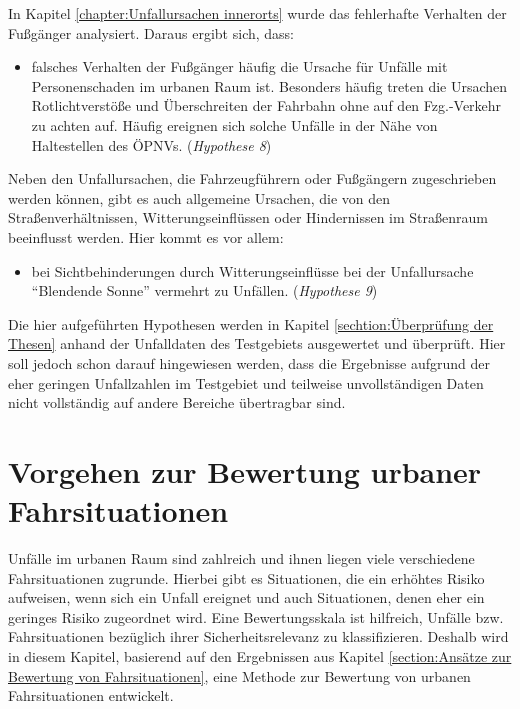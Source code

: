 In Kapitel \ref{chapter:Unfallursachen innerorts} wurde das fehlerhafte Verhalten der Fußgänger analysiert. Daraus ergibt sich, dass:
	
\begin{itemize}	
	\item falsches Verhalten der Fußgänger häufig die Ursache für Unfälle mit Personenschaden im urbanen Raum ist. Besonders häufig treten die Ursachen Rotlichtverstöße und Überschreiten der Fahrbahn ohne auf den Fzg.-Verkehr zu achten auf. Häufig ereignen sich solche Unfälle in der Nähe von Haltestellen des ÖPNVs. (\textit{Hypothese 8})
\end{itemize}	

Neben den Unfallursachen, die Fahrzeugführern oder Fußgängern zugeschrieben werden können, gibt es auch allgemeine Ursachen, die von den Straßenverhältnissen, Witterungseinflüssen oder Hindernissen im Straßenraum beeinflusst werden. Hier kommt es vor allem: 

\begin{itemize}	
	\item bei Sichtbehinderungen durch Witterungseinflüsse bei der Unfallursache \enquote{Blendende Sonne} vermehrt zu Unfällen. (\textit{Hypothese 9})
\end{itemize}

Die hier aufgeführten Hypothesen werden in Kapitel \ref{sechtion:Überprüfung der Thesen} anhand der Unfalldaten des Testgebiets ausgewertet und überprüft. Hier soll jedoch schon darauf hingewiesen werden, dass die Ergebnisse aufgrund der eher geringen Unfallzahlen im Testgebiet und teilweise unvollständigen Daten nicht vollständig auf andere Bereiche übertragbar sind.


\section{Vorgehen zur Bewertung urbaner Fahrsituationen}\label{section:Bewertung urbaner Fahrsituationen}
Unfälle im urbanen Raum sind zahlreich und ihnen liegen viele verschiedene Fahrsituationen zugrunde. Hierbei gibt es Situationen, die ein erhöhtes Risiko aufweisen, wenn sich ein Unfall ereignet und auch Situationen, denen eher ein geringes Risiko zugeordnet wird. Eine Bewertungsskala ist hilfreich, Unfälle bzw. Fahrsituationen bezüglich ihrer Sicherheitsrelevanz zu klassifizieren. Deshalb wird in diesem Kapitel, basierend auf den Ergebnissen aus Kapitel \ref{section:Ansätze zur Bewertung von Fahrsituationen}, eine Methode zur Bewertung von urbanen Fahrsituationen entwickelt.

